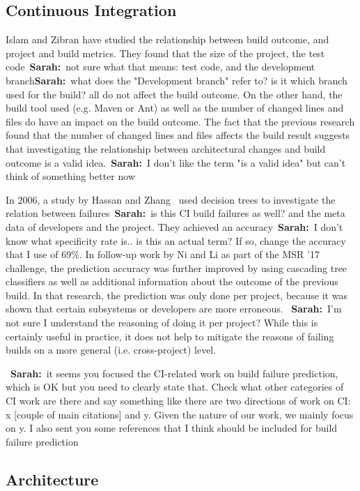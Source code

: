 \documentclass[sigplan, anonymous, review]{acmart}
\newcommand{\sn}[1]{{\color{blue}\textbf{Sarah:}~#1}}
\begin{document}
\subsection{Continuous Integration}

Islam and Zibran \cite{FailsCorr} have studied the relationship between build outcome, and project and build metrics. 
They found that the size of the project, the test code~\sn{not sure what that means: test code}, and the development branch\sn{what does the "Development branch" refer to? is it which branch used for the build?} all do not affect the build outcome.
On the other hand, the build tool used (e.g. Maven or Ant) as well as the number of changed lines and files do have an impact on the build outcome.
The fact that the previous research found that the number of changed lines and files affects the build result suggests that investigating the relationship between architectural changes and build outcome is a valid idea.~\sn{I don't like the term "is a valid idea" but can't think of something better now}

In 2006, a study by Hassan and Zhang~\cite{Pred-Tree} used decision trees to investigate the relation between failures~\sn{is this CI build failures as well?} and the meta data of developers and the project.
They achieved an accuracy~\sn{I don't know what specificity rate is.. is this an actual term? If so, change the accuracy that I use} of 69\%.
In follow-up work by Ni and Li as part of the MSR '17 challenge, the prediction accuracy was further improved by using cascading tree classifiers as well as additional information about the outcome of the previous build\cite{Pred-Cascade}. 
In that research, the prediction was only done per project, because it was shown that certain subsystems or developers are more erroneous. ~\sn{I'm not sure I understand the reasoning of doing it per project?}
While this is certainly useful in practice, it does not help to mitigate the reasons of failing builds on a more general (i.e. cross-project) level.

~\sn{it seems you focused the CI-related work on build failure prediction, which is OK but you need to clearly state that. Check what other categories of CI work are there and say something like there are two directions of work on CI: x [couple of main citations] and y. Given the nature of our work, we mainly focus on y. I also sent you some references that I think should be included for build failure prediction}

\subsection{Architecture}
\label{sec:relwork-arch}
\end{document}

